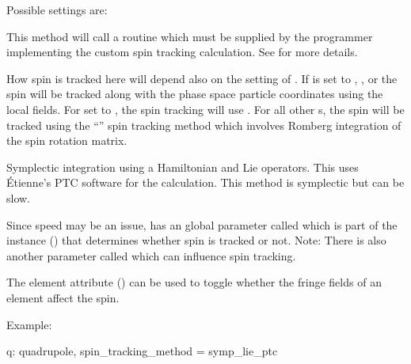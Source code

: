 Possible  settings are:
\begin{description}

\item[\vn{Custom}] \Newline
This method will call a routine  which must be supplied by the
programmer implementing the custom spin tracking calculation. See  for
more details.

\item[\vn{Tracking}] \Newline
How spin is tracked here will depend also on the setting of . If
 is set to , , or  the spin will
be tracked along with the phase space particle coordinates using the local fields. For
 set to , the spin tracking will use .  For all other
s, the spin will be tracked using the ``'' spin tracking
method which involves Romberg integration of the spin rotation matrix.

\item[\vn{Symp_Lie_PTC}] \Newline
Symplectic integration using a Hamiltonian and Lie operators.  This uses \'Etienne's PTC
software for the calculation.  This method is symplectic but can be slow.

\end{description}

Since speed may be an issue, \bmad has an global parameter called  which is
part of the  instance () that determines whether spin is tracked or
not. Note: There is also another  parameter called 
which can influence spin tracking.

The  element attribute () can be used to toggle
whether the fringe fields of an element affect the spin.

Example:
\begin{example}
  q: quadrupole, spin_tracking_method = symp_lie_ptc
\end{example}


